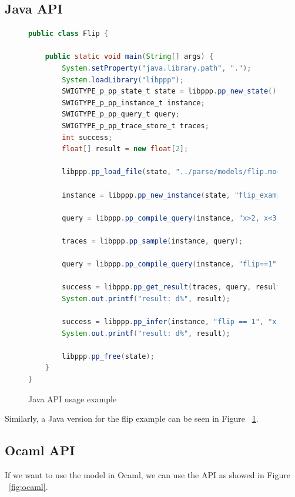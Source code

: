 \subsection{Java API}
\begin{figure}
\begin{lstlisting}[language=Java]
public class Flip {

    public static void main(String[] args) {
        System.setProperty("java.library.path", ".");
        System.loadLibrary("libppp");
        SWIGTYPE_p_pp_state_t state = libppp.pp_new_state();
        SWIGTYPE_p_pp_instance_t instance;
        SWIGTYPE_p_pp_query_t query;
        SWIGTYPE_p_pp_trace_store_t traces;
        int success;
        float[] result = new float[2];

        libppp.pp_load_file(state, "../parse/models/flip.model");

        instance = libppp.pp_new_instance(state, "flip_example", null);

        query = libppp.pp_compile_query(instance, "x>2, x<3");

        traces = libppp.pp_sample(instance, query);

        query = libppp.pp_compile_query(instance, "flip==1");

        success = libppp.pp_get_result(traces, query, result);
        System.out.printf("result: d%", result);

        success = libppp.pp_infer(instance, "flip == 1", "x > 2, x < 3", result);
        System.out.printf("result: d%", result);

        libppp.pp_free(state);
    }
}
\end{lstlisting}
\caption{Java API usage example}
\label{fig:java}
\end{figure}

Similarly, a Java version for the flip example can be seen in Figure ~\ref{fig:java}.\\

\subsection{Ocaml API}
If we want to use the model in Ocaml, we can use the API as showed in Figure ~\ref{fig:ocaml}. \\

